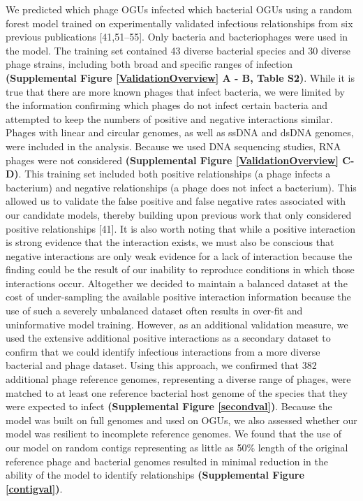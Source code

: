 \documentclass[12pt,]{article}
\begin{document}
We predicted which phage OGUs infected which bacterial OGUs using a
random forest model trained on experimentally validated infectious
relationships from six previous publications {[}41,51--55{]}. Only
bacteria and bacteriophages were used in the model. The training set
contained 43 diverse bacterial species and 30 diverse phage strains,
including both broad and specific ranges of infection
\textbf{(Supplemental Figure \ref{ValidationOverview} A - B, Table S2)}.
While it is true that there are more known phages that infect bacteria,
we were limited by the information confirming which phages do not infect
certain bacteria and attempted to keep the numbers of positive and
negative interactions similar. Phages with linear and circular genomes,
as well as ssDNA and dsDNA genomes, were included in the analysis.
Because we used DNA sequencing studies, RNA phages were not considered
\textbf{(Supplemental Figure \ref{ValidationOverview} C-D)}. This
training set included both positive relationships (a phage infects a
bacterium) and negative relationships (a phage does not infect a
bacterium). This allowed us to validate the false positive and false
negative rates associated with our candidate models, thereby building
upon previous work that only considered positive relationships {[}41{]}.
It is also worth noting that while a positive interaction is strong
evidence that the interaction exists, we must also be conscious that
negative interactions are only weak evidence for a lack of interaction
because the finding could be the result of our inability to reproduce
conditions in which those interactions occur. Altogether we decided to
maintain a balanced dataset at the cost of under-sampling the available
positive interaction information because the use of such a severely
unbalanced dataset often results in over-fit and uninformative model
training. However, as an additional validation measure, we used the
extensive additional positive interactions as a secondary dataset to
confirm that we could identify infectious interactions from a more
diverse bacterial and phage dataset. Using this approach, we confirmed
that 382 additional phage reference genomes, representing a diverse
range of phages, were matched to at least one reference bacterial host
genome of the species that they were expected to infect
\textbf{(Supplemental Figure \ref{secondval})}. Because the model was
built on full genomes and used on OGUs, we also assessed whether our
model was resilient to incomplete reference genomes. We found that the
use of our model on random contigs representing as little as 50\% length
of the original reference phage and bacterial genomes resulted in
minimal reduction in the ability of the model to identify relationships
\textbf{(Supplemental Figure \ref{contigval})}.
\end{document}
